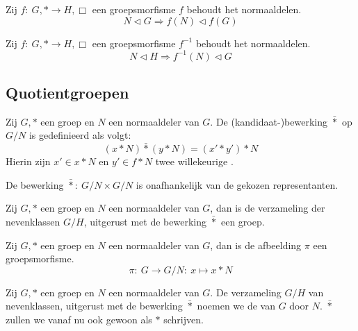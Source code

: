 \documentclass[main.tex]{subfiles}
\begin{document}
\begin{ei}
  Zij $f:\ G,* \rightarrow H,\Box$ een groepsmorfisme
  $f$ behoudt het normaaldelen.
  \[ N \triangleleft G \Rightarrow f(N) \triangleleft f(G) \]
  
\end{ei}

\begin{ei}
  Zij $f:\ G,* \rightarrow H,\Box$ een groepsmorfisme
  $f^{-1}$ behoudt het normaaldelen.
  \[ N \triangleleft H \Rightarrow f^{-1}(N) \triangleleft G \]
  
\end{ei}

\subsection{Quotientgroepen}
\label{sec:quotientgroepen}

\begin{de}
  Zij $G,*$ een groep en $N$ een normaaldeler van $G$.
  De (kandidaat-)bewerking $\bar{*}$ op $G/N$ is gedefinieerd als volgt:
  \[ (x*N)\bar{*}(y*N) = (x'*y')*N \]
  Hierin zijn $x'\in x*N$ en $y'\in f*N$ twee willekeurige .
\end{de}

\begin{pr}
  De bewerking $\bar{*}:\ G/N \times G/N$ is onafhankelijk van de gekozen representanten.
  
\end{pr}

\begin{st}
  Zij $G,*$ een groep en $N$ een normaaldeler van $G$, dan is de verzameling der nevenklassen $G/H$, uitgerust met de bewerking $\bar{*}$ een groep.
  
\end{st}

\begin{st}
  Zij $G,*$ een groep en $N$ een normaaldeler van $G$, dan is de afbeelding $\pi$ een groepsmorfisme.
  \[ \pi:\ G \rightarrow G/N:\ x \mapsto x*N \]
  
\end{st}

\begin{de}
  Zij $G,*$ een groep en $N$ een normaaldeler van $G$.
  De verzameling $G/H$ van nevenklassen, uitgerust met de bewerking $\bar{*}$ noemen we de  van $G$ door $N$.
  $\bar{*}$ zullen we vanaf nu ook gewoon als $*$ schrijven.
\end{de}
\end{document}
